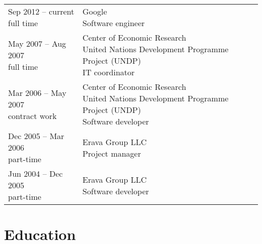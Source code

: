 \documentclass[letterpaper]{article}
\begin{document}
\begin{table}[h]
	\begin{tabular}{ll}
	\parbox[t]{5cm}{
		Sep 2012 -- current \\
		full time
	} &
	\parbox[t]{15cm}{
		Google \\
		Software engineer
		\vspace{1em}
    } \\
	\parbox[t]{5cm}{
		May 2007 -- Aug 2007 \\
		full time
	} &
	\parbox[t]{15cm}{
		Center of Economic Research \\
    	United Nations Development Programme Project (UNDP)\\
		IT coordinator
		\vspace{1em}
    } \\
	\parbox[t]{5cm}{
		Mar 2006 -- May 2007 \\
		contract work
	} &
	\parbox[t]{15cm}{
		Center of Economic Research \\
    	United Nations Development Programme Project (UNDP)\\
		Software developer
		\vspace{1em}
    } \\
    \parbox[t]{5cm}{
		Dec 2005 -- Mar 2006\\
		part-time
	} &
	\parbox[t]{15cm}{
		Erava Group LLC\\
		Project manager
		\vspace{1em}
    } \\    
    \parbox[t]{5cm}{
		Jun 2004 -- Dec 2005\\
		part-time
	} &
	\parbox[t]{15cm}{
		Erava Group LLC\\
		Software developer
    } \\
    \end{tabular}
\end{table}

\section*{Education}
\end{document}

